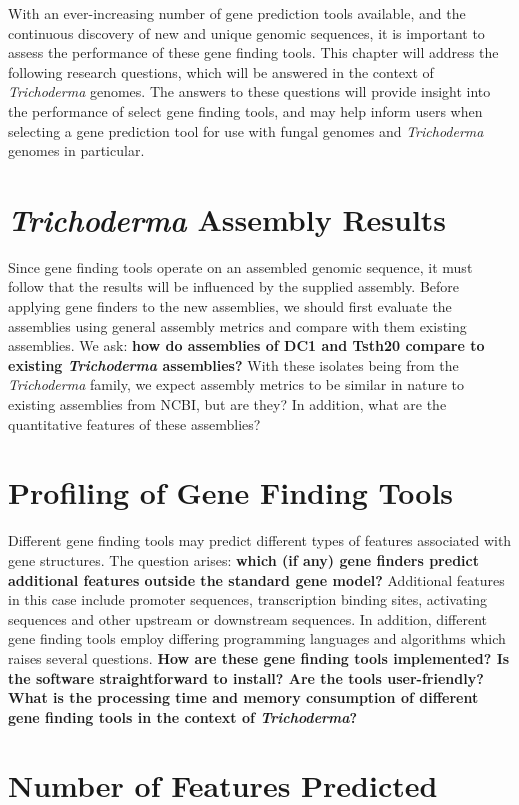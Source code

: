 With an ever-increasing number of gene prediction tools available, and the continuous discovery of new and unique genomic sequences, it is important to assess the performance of these gene finding tools. This chapter will address the following research questions, which will be answered in the context of \textit{Trichoderma} genomes. The answers to these questions will provide insight into the performance of select gene finding tools, and may help inform users when selecting a gene prediction tool for use with fungal genomes and \textit{Trichoderma} genomes in particular.

\section{\textit{Trichoderma} Assembly Results}
\label{rq:assembly-results}
Since gene finding tools operate on an assembled genomic sequence, it
must follow that the results will be influenced by the supplied
assembly. Before applying gene finders to the new assemblies, we
should first evaluate the assemblies using general assembly metrics and compare with them existing assemblies. We ask: \textbf{how do assemblies of DC1 and
  Tsth20 compare to existing \textit{Trichoderma} assemblies?} With
these isolates being from the \textit{Trichoderma} family, we expect
assembly metrics to be similar in nature to existing assemblies from
NCBI, but are they? In addition, what are the quantitative features of these assemblies?

\section{Profiling of Gene Finding Tools}
\label{rq:gene-finding-tools}
Different gene finding tools may predict different types of features
associated with gene structures. The question arises: \textbf{which
  (if any) gene finders predict additional features outside the
  standard gene model?} Additional features in this case include
promoter sequences, transcription binding sites, activating sequences
and other upstream or downstream sequences. In addition, different
gene finding tools employ differing programming languages and
algorithms which raises several questions. \textbf{How are these gene
  finding tools implemented? Is the software straightforward to
  install? Are the tools user-friendly? What is the processing time
  and memory consumption of different gene finding tools in the
  context of \textit{Trichoderma}?}

\section{Number of Features Predicted}
\label{rq:number-of-features}  


